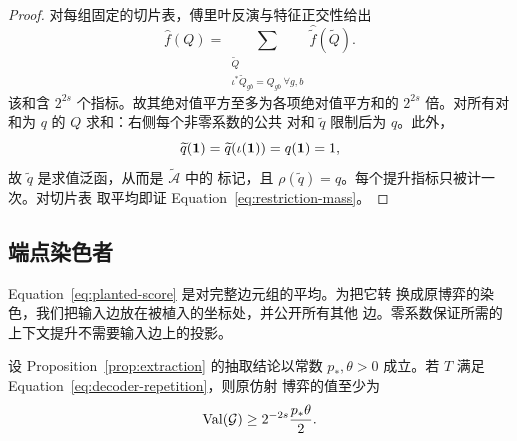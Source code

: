 \begin{proof}
对每组固定的切片表，傅里叶反演与特征正交性给出
\[
 \widehat f(Q)=
 \sum_{\substack{\widetilde Q\\
                  \iota^*\widetilde Q_{gb}=Q_{gb}\ \forall g,b}}
       \widehat{\widetilde f}(\widetilde Q).
\]
该和含 $2^{2s}$ 个指标。故其绝对值平方至多为各项绝对值平方和的
$2^{2s}$ 倍。对所有对和为 $q$ 的 $Q$ 求和：右侧每个非零系数的公共
对和 $\widetilde q$ 限制后为 $q$。此外，
\[
 \widetilde q(\mathbf 1)=\widetilde q(\iota(\mathbf 1))=q(\mathbf 1)=1,
\]
故 $\widetilde q$ 是求值泛函，从而是 $\widetilde{\mathcal A}$ 中的
标记，且 $\rho(\widetilde q)=q$。每个提升指标只被计一次。对切片表
取平均即证 Equation~\eqref{eq:restriction-mass}。
\end{proof}

\subsection{端点染色者}

Equation~\eqref{eq:planted-score} 是对完整边元组的平均。为把它转
换成原博弈的染色，我们把输入边放在被植入的坐标处，并公开所有其他
边。零系数保证所需的上下文提升不需要输入边上的投影。

\begin{proposition}[解码]\label{prop:decoding}
设 Proposition~\ref{prop:extraction} 的抽取结论以常数 $p_*,\theta>0$
成立。若 $T$ 满足 Equation~\eqref{eq:decoder-repetition}，则原仿射
博弈的值至少为
\begin{equation}\label{eq:decoded-value}
 \operatorname{Val}(\mathcal G)\geq 2^{-2s}\frac{p_*\theta}{2}.
\end{equation}
\end{proposition}


